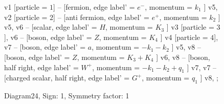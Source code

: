 \documentclass{revtex4}
\begin{document}
\begin{figure}[!htb]
\begin{center}
{    %
v1 [particle = \(1\)] -- [fermion, edge label' = \(e^{-}\), momentum = \(k_{1}\) ] v5, 
v2 [particle = \(2\)] -- [anti fermion, edge label' = \(e^{+}\), momentum = \(k_{2}\) ] v5, 
v6 -- [scalar, edge label' = \(H\), momentum = \(K_{3}\) ] v3 [particle = \(3\)], 
v6 -- [boson, edge label' = \(Z\), momentum = \(K_{4}\) ] v4 [particle = \(4\)], 
v7 -- [boson, edge label' = \(a\), momentum = \(-k_{1} - k_{2}\) ] v5, 
v8 -- [boson, edge label' = \(Z\), momentum = \(K_{3} + K_{4}\) ] v6, 
v8 -- [boson, half right, edge label' = \(W^{+}\), momentum = \(-k_{1} - k_{2} + q_{1}\) ] v7, 
v7 -- [charged scalar, half right, edge label' = \(G^{+}\), momentum = \(q_{1}\) ] v8, 
};
\end{center}
\caption{Diagram24, Sign: 1, Symmetry factor: 1}
\end{figure}
\newpage
\end{document}
